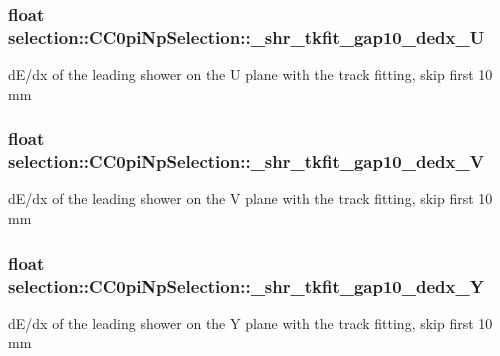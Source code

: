 \subsubsection[{\texorpdfstring{\+\_\+shr\+\_\+tkfit\+\_\+gap10\+\_\+dedx\+\_\+U}{_shr_tkfit_gap10_dedx_U}}]{\setlength{\rightskip}{0pt plus 5cm}float selection\+::\+C\+C0pi\+Np\+Selection\+::\+\_\+shr\+\_\+tkfit\+\_\+gap10\+\_\+dedx\+\_\+U\hspace{0.3cm}{\ttfamily [private]}}\hypertarget{classselection_1_1CC0piNpSelection_a3b32a837b2388327cee3eb07ad25a557}{}\label{classselection_1_1CC0piNpSelection_a3b32a837b2388327cee3eb07ad25a557}
d\+E/dx of the leading shower on the U plane with the track fitting, skip first 10 mm 
\subsubsection[{\texorpdfstring{\+\_\+shr\+\_\+tkfit\+\_\+gap10\+\_\+dedx\+\_\+V}{_shr_tkfit_gap10_dedx_V}}]{\setlength{\rightskip}{0pt plus 5cm}float selection\+::\+C\+C0pi\+Np\+Selection\+::\+\_\+shr\+\_\+tkfit\+\_\+gap10\+\_\+dedx\+\_\+V\hspace{0.3cm}{\ttfamily [private]}}\hypertarget{classselection_1_1CC0piNpSelection_adf21374d01634ceeb71cdcb954c40b98}{}\label{classselection_1_1CC0piNpSelection_adf21374d01634ceeb71cdcb954c40b98}
d\+E/dx of the leading shower on the V plane with the track fitting, skip first 10 mm 
\subsubsection[{\texorpdfstring{\+\_\+shr\+\_\+tkfit\+\_\+gap10\+\_\+dedx\+\_\+Y}{_shr_tkfit_gap10_dedx_Y}}]{\setlength{\rightskip}{0pt plus 5cm}float selection\+::\+C\+C0pi\+Np\+Selection\+::\+\_\+shr\+\_\+tkfit\+\_\+gap10\+\_\+dedx\+\_\+Y\hspace{0.3cm}{\ttfamily [private]}}\hypertarget{classselection_1_1CC0piNpSelection_ae4ccdcc53f1b3e72cb360af8af316eb8}{}\label{classselection_1_1CC0piNpSelection_ae4ccdcc53f1b3e72cb360af8af316eb8}
d\+E/dx of the leading shower on the Y plane with the track fitting, skip first 10 mm 
